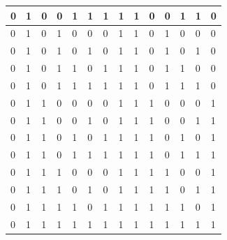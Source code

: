 \documentclass{report}
\begin{document}
\begin{longtable}{|l|l|l|l|l|l|l|l|l|l|l|l|l|l|}
                    0 & 1 & 0 & 0 & 1 & 1 & 1 & 1 & 1 & 0 & 0 & 1 & 1 & 0 \\ \hline
                    0 & 1 & 0 & 1 & 0 & 0 & 0 & 1 & 1 & 0 & 1 & 0 & 0 & 0 \\ \hline
                    0 & 1 & 0 & 1 & 0 & 1 & 0 & 1 & 1 & 0 & 1 & 0 & 1 & 0 \\ \hline
                    0 & 1 & 0 & 1 & 1 & 0 & 1 & 1 & 1 & 0 & 1 & 1 & 0 & 0 \\ \hline
                    0 & 1 & 0 & 1 & 1 & 1 & 1 & 1 & 1 & 0 & 1 & 1 & 1 & 0 \\ \hline
                    0 & 1 & 1 & 0 & 0 & 0 & 0 & 1 & 1 & 1 & 0 & 0 & 0 & 1 \\ \hline
                    0 & 1 & 1 & 0 & 0 & 1 & 0 & 1 & 1 & 1 & 0 & 0 & 1 & 1 \\ \hline
                    0 & 1 & 1 & 0 & 1 & 0 & 1 & 1 & 1 & 1 & 0 & 1 & 0 & 1 \\ \hline
                    0 & 1 & 1 & 0 & 1 & 1 & 1 & 1 & 1 & 1 & 0 & 1 & 1 & 1 \\ \hline
                    0 & 1 & 1 & 1 & 0 & 0 & 0 & 1 & 1 & 1 & 1 & 0 & 0 & 1 \\ \hline
                    0 & 1 & 1 & 1 & 0 & 1 & 0 & 1 & 1 & 1 & 1 & 0 & 1 & 1 \\ \hline
                    0 & 1 & 1 & 1 & 1 & 0 & 1 & 1 & 1 & 1 & 1 & 1 & 0 & 1 \\ \hline
                    0 & 1 & 1 & 1 & 1 & 1 & 1 & 1 & 1 & 1 & 1 & 1 & 1 & 1 \\ \hline
                \end{longtable}
\end{document}
